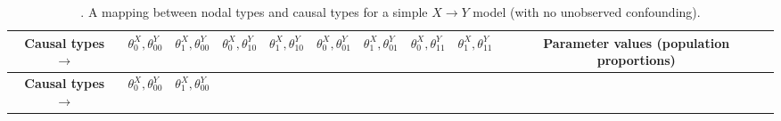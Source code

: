 \documentclass[12pt,]{book}
\begin{document}
\begin{longtable}[]{@{}cccccccccc@{}}
\caption{\label{tab:parammmatrix}. A mapping between nodal types and causal types for a simple \(X \rightarrow Y\) model (with no unobserved confounding).}\tabularnewline
\toprule
\begin{minipage}[b]{0.10\columnwidth}\centering
\textbf{Causal types} \(\rightarrow\)\strut
\end{minipage} & \begin{minipage}[b]{0.07\columnwidth}\centering
\(\theta^X_0,\theta^Y_{00}\)\strut
\end{minipage} & \begin{minipage}[b]{0.07\columnwidth}\centering
\(\theta^X_1,\theta^Y_{00}\)\strut
\end{minipage} & \begin{minipage}[b]{0.07\columnwidth}\centering
\(\theta^X_0,\theta^Y_{10}\)\strut
\end{minipage} & \begin{minipage}[b]{0.07\columnwidth}\centering
\(\theta^X_1,\theta^Y_{10}\)\strut
\end{minipage} & \begin{minipage}[b]{0.07\columnwidth}\centering
\(\theta^X_0,\theta^Y_{01}\)\strut
\end{minipage} & \begin{minipage}[b]{0.07\columnwidth}\centering
\(\theta^X_1,\theta^Y_{01}\)\strut
\end{minipage} & \begin{minipage}[b]{0.07\columnwidth}\centering
\(\theta^X_0,\theta^Y_{11}\)\strut
\end{minipage} & \begin{minipage}[b]{0.07\columnwidth}\centering
\(\theta^X_1,\theta^Y_{11}\)\strut
\end{minipage} & \begin{minipage}[b]{0.10\columnwidth}\centering
Parameter values (population proportions)\strut
\end{minipage}\tabularnewline
\midrule
\endfirsthead
\toprule
\begin{minipage}[b]{0.10\columnwidth}\centering
\textbf{Causal types} \(\rightarrow\)\strut
\end{minipage} & \begin{minipage}[b]{0.07\columnwidth}\centering
\(\theta^X_0,\theta^Y_{00}\)\strut
\end{minipage} & \begin{minipage}[b]{0.07\columnwidth}\centering
\(\theta^X_1,\theta^Y_{00}\)\strut

\end{minipage}
\end{longtable}
\end{document}
